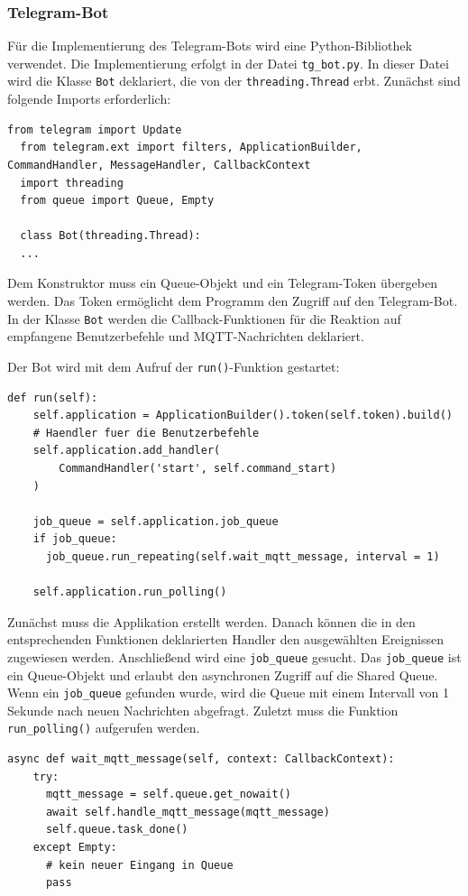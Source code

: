 \documentclass[12pt, letterpaper]{article}
\begin{document}
\subsubsection{Telegram-Bot}
\par Für die Implementierung des Telegram-Bots wird eine Python-Bibliothek verwendet. Die Implementierung erfolgt in der Datei \texttt{tg\_bot.py}. In dieser Datei wird die Klasse \texttt{Bot} deklariert, die von der \texttt{threading.Thread} erbt. Zunächst sind folgende Imports erforderlich:
\begin{lstlisting}[style=py,caption={tg\_bot.py: imports}]
  from telegram import Update
  from telegram.ext import filters, ApplicationBuilder, CommandHandler, MessageHandler, CallbackContext
  import threading
  from queue import Queue, Empty

  class Bot(threading.Thread):
  ...
\end{lstlisting}
\par Dem Konstruktor muss ein Queue-Objekt und ein Telegram-Token übergeben werden. Das Token ermöglicht dem Programm den Zugriff auf den Telegram-Bot. In der Klasse \texttt{Bot} werden die Callback-Funktionen für die Reaktion auf empfangene Benutzerbefehle und MQTT-Nachrichten deklariert.
\par Der Bot wird mit dem Aufruf der \texttt{run()}-Funktion gestartet:
\begin{lstlisting}[style=py, caption={tg\_bot.py: run()}]
  def run(self):
    self.application = ApplicationBuilder().token(self.token).build()
    # Haendler fuer die Benutzerbefehle
    self.application.add_handler(
        CommandHandler('start', self.command_start)
    )
    
    job_queue = self.application.job_queue
    if job_queue:
      job_queue.run_repeating(self.wait_mqtt_message, interval = 1)

    self.application.run_polling()
\end{lstlisting}
\par Zunächst muss die Applikation erstellt werden. Danach können die in den entsprechenden Funktionen deklarierten Handler den ausgewählten Ereignissen zugewiesen werden. Anschließend wird eine \texttt{job\_queue} gesucht. Das \texttt{job\_queue} ist ein Queue-Objekt und erlaubt den asynchronen Zugriff auf die Shared Queue. Wenn ein \texttt{job\_queue} gefunden wurde, wird die Queue mit einem Intervall von 1 Sekunde nach neuen Nachrichten abgefragt. Zuletzt muss die Funktion \texttt{run\_polling()} aufgerufen werden.
\begin{lstlisting}[frame=single,style=py,caption={tg\_bot.py: wait\_mqtt\_message()}]
  async def wait_mqtt_message(self, context: CallbackContext):
    try:
      mqtt_message = self.queue.get_nowait()
      await self.handle_mqtt_message(mqtt_message)
      self.queue.task_done()
    except Empty:
      # kein neuer Eingang in Queue
      pass
\end{lstlisting}
\end{document}

